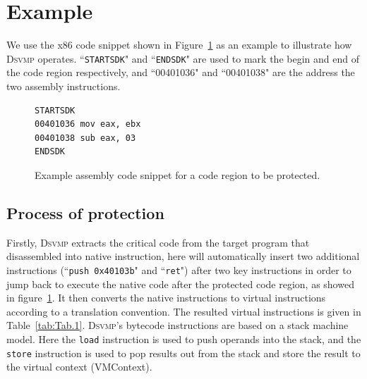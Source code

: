 \documentclass[preprint,12pt,3p]{elsarticle}
\newcommand{\DSVMP}{\textsc{Dsvmp}\xspace}
\begin{document}
\section{Example}\label{sec:case}
We use the x86 code snippet shown in Figure~\ref{fig:examplecode} as an example to illustrate how \DSVMP operates.
``\texttt{STARTSDK}" and ``\texttt{ENDSDK}" are used to mark the begin and end of the code region respectively,
and ``00401036" and ``00401038" are the address the two assembly instructions.

\begin{figure}[t!]
\scriptsize
\begin{lstlisting}
STARTSDK
00401036 mov eax, ebx
00401038 sub eax, 03
ENDSDK
\end{lstlisting}
\caption{Example assembly code snippet for a code region to be protected.}
\label{fig:examplecode}
\end{figure}

\subsection{Process of protection}
Firstly, \DSVMP extracts the critical code from the target program that disassembled into native instruction, here will automatically insert two additional instructions (``\texttt{push 0x40103b}" and ``\texttt{ret}") after two key
instructions in order to jump back to execute the native code
after the protected code region, as showed in figure~\ref{fig:examplecode}.
It then converts the native instructions to virtual instructions according to a translation convention.
The resulted virtual instructions is given in Table~\ref{tab:Tab.1}.
\DSVMP's bytecode instructions are based on a stack machine model.
Here the \texttt{load} instruction is used to push operands into the stack,
and the \texttt{store} instruction is used to pop results out from the stack
and store the result to the virtual context (VMContext).
\end{document}
